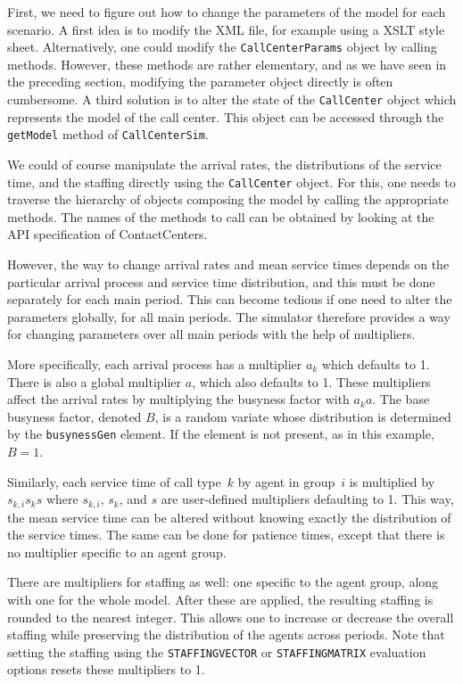 First, we need to figure out how to change the parameters of the model
for each scenario.
A first idea is to modify the XML file, for example using a XSLT style
sheet.
Alternatively, one could modify the \texttt{Call\-Center\-Params}
object by calling methods.
However, these methods are rather elementary, and as we have seen in
the preceding section, modifying the parameter object directly is
often cumbersome.
A third solution is to alter the state of the \texttt{Call\-Center}
object which represents the model of the call center.
This object can be accessed through the \texttt{get\-Model} method of
\texttt{Call\-Center\-Sim}.

We could of course manipulate the arrival rates, the distributions of
the service time, and the staffing directly using the
\texttt{Call\-Center} object.
For this, one needs to traverse the hierarchy of objects composing the
model by calling the appropriate methods. The names of the methods to
call can be obtained by looking at the API specification of
ContactCenters.

However, the way to change arrival rates and mean service times
depends on the particular arrival process and service time
distribution, and
this must be done separately for each main period.
This can become tedious if one need to alter the parameters globally,
for all main periods.
The simulator therefore provides a way for changing parameters over
all main periods with the help of multipliers.

More specifically, each arrival process has a multiplier $a_k$ which
defaults to 1.  There is also a global multiplier $a$, which also
defaults to 1.  These multipliers affect the arrival rates by
multiplying the busyness factor with $a_ka$.   The base busyness factor,
denoted $B$, is a random variate whose distribution is determined by
the \texttt{busyness\-Gen} element.
If the element is not present, as in this example, $B=1$.

Similarly, each service time of call type~$k$ by agent in group~$i$
is multiplied by $s_{k,i}s_ks$ where $s_{k,i}$, $s_k$, and $s$ are
user-defined multipliers defaulting to 1.
This way, the mean service time can be altered without knowing exactly
the distribution of the service times.
The same can be done for patience times, except that there is no
multiplier specific to an agent group.

There are multipliers for staffing as well: one specific to the agent
group,
along with one for the whole model. After these are applied,
the resulting staffing is rounded to the nearest integer.
This allows one to increase or decrease the overall staffing while
preserving the distribution of the agents across periods.
Note that setting the staffing using the \texttt{STAFFINGVECTOR} or
\texttt{STAFFINGMATRIX} evaluation options resets these multipliers to 1.

